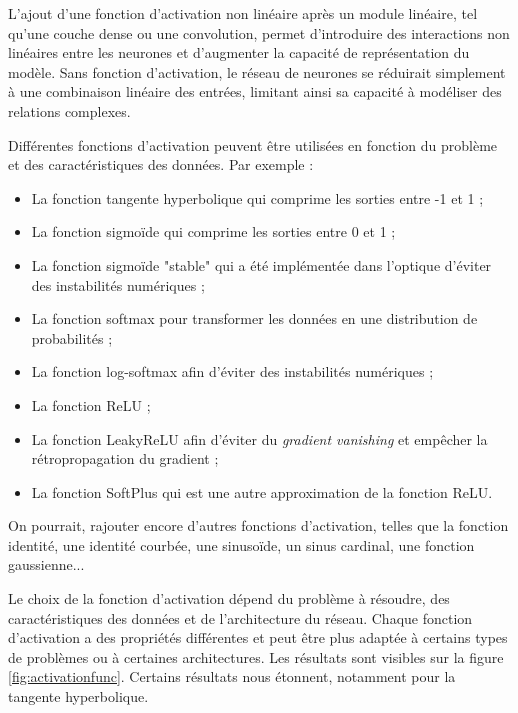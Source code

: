 \documentclass{article}
\begin{document}
L'ajout d'une fonction d'activation non linéaire après un module linéaire, tel qu'une couche dense ou une convolution, permet d'introduire des interactions non linéaires entre les neurones et d'augmenter la capacité de représentation du modèle. Sans fonction d'activation, le réseau de neurones se réduirait simplement à une combinaison linéaire des entrées, limitant ainsi sa capacité à modéliser des relations complexes.

Différentes fonctions d'activation peuvent être utilisées en fonction du problème et des caractéristiques des données. Par exemple :

\begin{itemize}
    \item La fonction tangente hyperbolique qui comprime les sorties entre -1 et 1 ;
    \item La fonction sigmoïde qui comprime les sorties entre 0 et 1 ;
    \item La fonction sigmoïde "stable" qui a été implémentée dans l'optique d'éviter des instabilités numériques ;
    \item La fonction softmax pour transformer les données en une distribution de probabilités ;
    \item La fonction log-softmax afin d'éviter des instabilités numériques ;
    \item La fonction ReLU ;
    \item La fonction LeakyReLU afin d'éviter du \textit{gradient vanishing} et empêcher la rétropropagation du gradient ;
    \item La fonction SoftPlus qui est une autre approximation de la fonction ReLU.
\end{itemize}

On pourrait, rajouter encore d'autres fonctions d'activation, telles que la fonction identité, une identité courbée, une sinusoïde, un sinus cardinal, une fonction gaussienne...

Le choix de la fonction d'activation dépend du problème à résoudre, des caractéristiques des données et de l'architecture du réseau. Chaque fonction d'activation a des propriétés différentes et peut être plus adaptée à certains types de problèmes ou à certaines architectures. Les résultats sont visibles sur la figure \ref{fig:activationfunc}. Certains résultats nous étonnent, notamment pour la tangente hyperbolique. 
\end{document}
